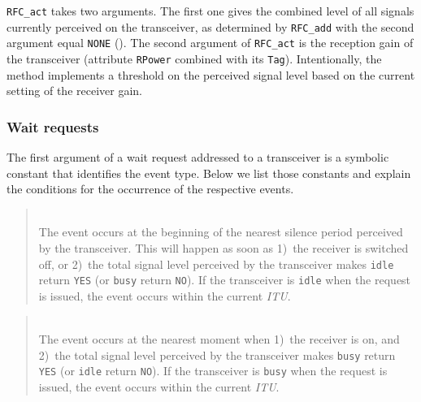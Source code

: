 {\tt RFC\_act} takes two arguments.
The first one gives the combined level of all signals currently perceived
on the transceiver, as determined by {\tt RFC\_add} with the second argument
equal {\tt NONE} ().
The second argument of {\tt RFC\_act} is the reception gain of the
transceiver (attribute {\tt RPower} combined with its {\tt Tag}).
Intentionally, the method implements a threshold on the perceived signal
level based on the current setting of the receiver gain.

\subsubsection{Wait requests}
\label{rm_tr_pp_wr}

The first argument of a wait request addressed to a transceiver is a symbolic
constant that identifies the event type.
Below we list those constants and explain the conditions for the
occurrence of the respective events.

\medskip

\begin{quote}
\noindent{}\\ \hspace{0in}
The event occurs at the beginning of the nearest silence
period perceived by the transceiver.
This will happen as soon as 1)~the receiver is switched off, or 2)~the
total signal level perceived by the transceiver makes {\tt idle}
return {\tt YES} (or {\tt busy} return {\tt NO}).
If the transceiver is {\tt idle} 
when the request is issued,
the event occurs within the current {\em ITU}.
\end{quote}

\begin{quote}
\noindent{}\\ \hspace{0in}
The event occurs at the nearest moment when 1)~the receiver is on, and 2)~the
total signal level perceived by the transceiver makes {\tt busy} return
{\tt YES} (or {\tt idle} return {\tt NO}).
If the transceiver is {\tt busy} when the request is issued,
the event occurs within the current {\em ITU}.
\end{quote}


